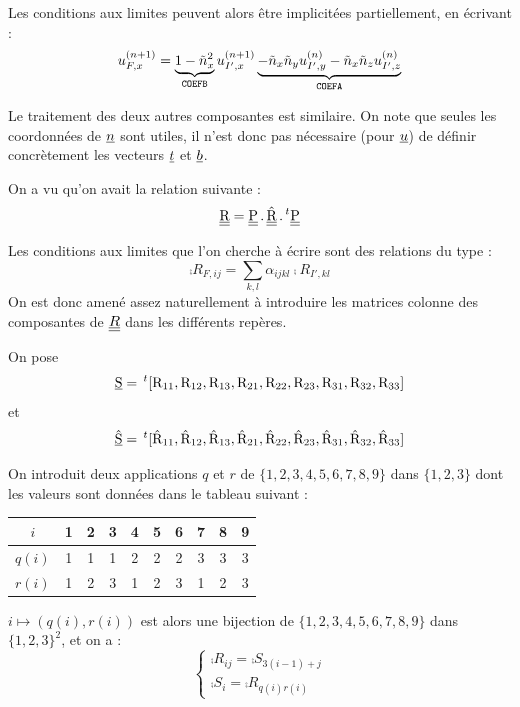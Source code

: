 Les conditions aux limites peuvent alors \^etre implicit\'ees partiellement, en
\'ecrivant :
\begin{equation}
\label{Base_Clsyvt_eq_clU}
u_{F,x}^{(n+1)} = \underbrace{1-\tilde{n}_x^2}_{\text{\texttt{COEFB}}}u_{I',x}^{(n+1)}
\underbrace{-\tilde{n}_x\tilde{n}_y u_{I',y}^{(n)}
-\tilde{n}_x\tilde{n}_z u_{I',z}^{(n)}}_{\text{\texttt{COEFA}}}
\end{equation}

Le traitement des deux autres composantes est similaire. On note que seules les
coordonn\'ees de $\underline{n}$ sont utiles, il n'est donc pas n\'ecessaire (pour
$\underline{u}$) de d\'efinir concr\`etement les vecteurs $\underline{t}$ et $\underline{b}$.

\vspace{1cm}
On a vu qu'on avait la relation suivante :
\begin{equation}
\label{Base_Clsyvt_eq_chgtrepR}
\underline{\underline{\textrm{R}}}= \underline{\underline{\textrm{P}}}\,.\,\hat{\underline{\underline{\textrm{R}}}}\,.\,^t\underline{\underline{\textrm{P}}}
\end{equation}

Les conditions aux limites que l'on cherche \`a \'ecrire sont des relations du
type :
\begin{equation}
\comp{R}_{F,ij}=\sum_{k,l}\alpha_{ijkl}\comp{R}_{I',kl}
\end{equation}
On est donc amen\'e assez naturellement \`a introduire les matrices colonne des
composantes de $\underline{\underline{R}}$ dans les diff\'erents rep\`eres.

On pose
\begin{equation}
\underline{\textrm{S}}=\,^t[\textrm{R}_{11},\textrm{R}_{12},\textrm{R}_{13},
\textrm{R}_{21},\textrm{R}_{22},\textrm{R}_{23},
\textrm{R}_{31},\textrm{R}_{32},\textrm{R}_{33}]
\end{equation}
et
\begin{equation}
\hat{\underline{\textrm{S}}}=\,^t[\hat{\textrm{R}}_{11},\hat{\textrm{R}}_{12},\hat{\textrm{R}}_{13},
\hat{\textrm{R}}_{21},\hat{\textrm{R}}_{22},\hat{\textrm{R}}_{23},
\hat{\textrm{R}}_{31},\hat{\textrm{R}}_{32},\hat{\textrm{R}}_{33}]
\end{equation}

On introduit deux applications $q$ et $r$ de $\{1,2,3,4,5,6,7,8,9\}$ dans
$\{1,2,3\}$ dont les valeurs sont donn\'ees dans le tableau suivant :
\begin{center}
\begin{tabular}{|c|c|c|c|c|c|c|c|c|c|}
\hline
$i$&1&2&3&4&5&6&7&8&9\\
\hline
$q(i)$&1&1&1&2&2&2&3&3&3\\
\hline
$r(i)$&1&2&3&1&2&3&1&2&3\\
\hline
\end{tabular}
\end{center}
$i\longmapsto (q(i),r(i))$ est alors une bijection de $\{1,2,3,4,5,6,7,8,9\}$
dans $\{1,2,3\}^2$, et on a :
\begin{equation}
\left\{\begin{array}{l}
\comp{R}_{ij}=\comp{S}_{3(i-1)+j}\\
\comp{S}_i=\comp{R}_{q(i)r(i)}
\end{array}\right.
\end{equation}

